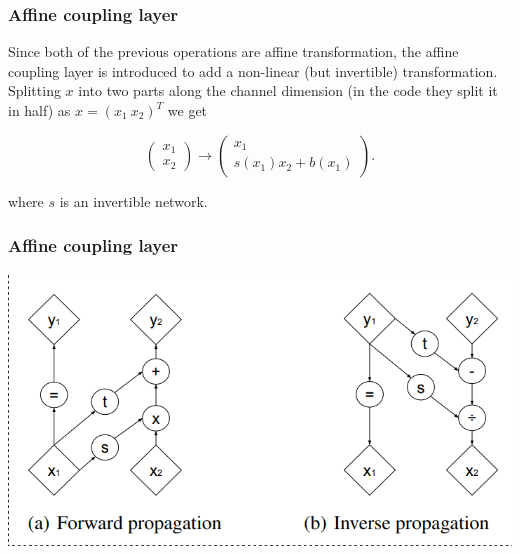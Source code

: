 \documentclass{beamer}
\begin{document}
\begin{frame}
  \frametitle{Affine coupling layer}

  Since both of the previous operations are affine transformation, the affine
  coupling layer is introduced to add a non-linear (but invertible)
  transformation. Splitting $x$ into two parts along the channel dimension (in
  the code they split it in half) as $x = (x_1\  x_2)^T$ we get

  \[
    \begin{pmatrix} x_1 \\ x_2 \end{pmatrix} \rightarrow
    \begin{pmatrix} x_1 \\ s(x_1) x_2 + b(x_1) \end{pmatrix}.
  \]

  where $s$ is an invertible network.

\end{frame}

\begin{frame}
  \frametitle{Affine coupling layer}

  \includegraphics[width=1.0\textwidth]{glow-affine-coupling.png}
\end{frame}
\end{document}
